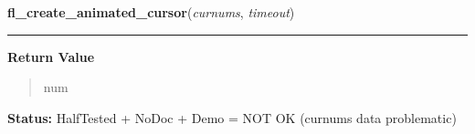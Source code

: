     \label{xformslib:library:fl_create_animated_cursor}

    \vspace{0.5ex}

\hspace{.8\funcindent}\begin{boxedminipage}{\funcwidth}

    \raggedright \textbf{fl\_create\_animated\_cursor}(\textit{curnums}, \textit{timeout})

    \vspace{-1.5ex}

    \rule{\textwidth}{0.5\fboxrule}
\setlength{\parskip}{2ex}
\setlength{\parskip}{1ex}
      \textbf{Return Value}
    \vspace{-1ex}

      \begin{quote}
      num

      \end{quote}

\textbf{Status:} HalfTested + NoDoc + Demo = NOT OK (curnums data problematic)



    \end{boxedminipage}

    \label{xformslib:library:fl_get_cursor_byname}

    \vspace{0.5ex}

